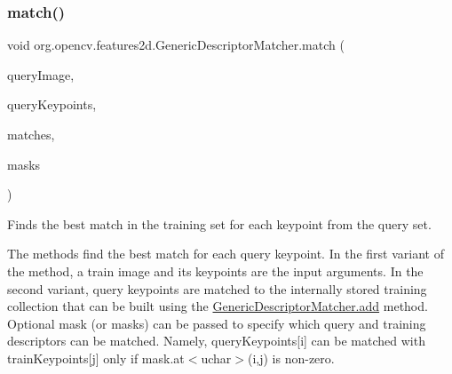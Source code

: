 \subsubsection{\texorpdfstring{match()}{match()}\hspace{0.1cm}{\footnotesize\ttfamily [3/4]}}
{\footnotesize\ttfamily void org.\+opencv.\+features2d.\+Generic\+Descriptor\+Matcher.\+match (\begin{DoxyParamCaption}\item[{\mbox{\hyperlink{classorg_1_1opencv_1_1core_1_1_mat}{Mat}}}]{query\+Image,  }\item[{\mbox{\hyperlink{classorg_1_1opencv_1_1core_1_1_mat_of_key_point}{Mat\+Of\+Key\+Point}}}]{query\+Keypoints,  }\item[{\mbox{\hyperlink{classorg_1_1opencv_1_1core_1_1_mat_of_d_match}{Mat\+Of\+D\+Match}}}]{matches,  }\item[{List$<$ \mbox{\hyperlink{classorg_1_1opencv_1_1core_1_1_mat}{Mat}} $>$}]{masks }\end{DoxyParamCaption})}

Finds the best match in the training set for each keypoint from the query set.

The methods find the best match for each query keypoint. In the first variant of the method, a train image and its keypoints are the input arguments. In the second variant, query keypoints are matched to the internally stored training collection that can be built using the {\ttfamily \mbox{\hyperlink{classorg_1_1opencv_1_1features2d_1_1_generic_descriptor_matcher_ad0e0a234636c370c74fdd4086ac5c716}{Generic\+Descriptor\+Matcher.\+add}}} method. Optional mask (or masks) can be passed to specify which query and training descriptors can be matched. Namely, {\ttfamily query\+Keypoints\mbox{[}i\mbox{]}} can be matched with {\ttfamily train\+Keypoints\mbox{[}j\mbox{]}} only if {\ttfamily mask.\+at$<$uchar$>$(i,j)} is non-\/zero.


